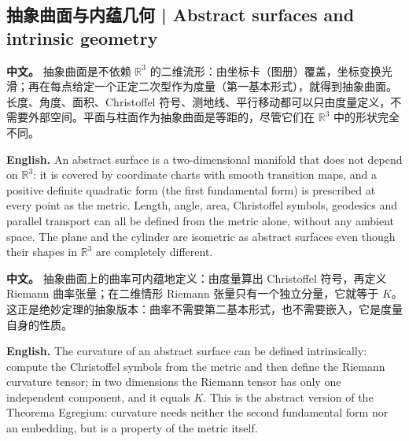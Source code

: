 \documentclass[UTF8,11pt,a4paper]{ctexart}
\newcommand{\APS}[2]{\par\noindent\textbf{中文。} #1\par\noindent\textbf{English.} #2\par\smallskip}
\newcommand{\RR}{\mathbb{R}}
\begin{document}
\subsection{抽象曲面与内蕴几何 | Abstract surfaces and intrinsic geometry}
\APS{抽象曲面是不依赖 $\RR^3$ 的二维流形：由坐标卡（图册）覆盖，坐标变换光滑；再在每点给定一个正定二次型作为度量（第一基本形式），就得到抽象曲面。长度、角度、面积、Christoffel 符号、测地线、平行移动都可以只由度量定义，不需要外部空间。平面与柱面作为抽象曲面是等距的，尽管它们在 $\RR^3$ 中的形状完全不同。}{An abstract surface is a two-dimensional manifold that does not depend on $\RR^3$: it is covered by coordinate charts with smooth transition maps, and a positive definite quadratic form (the first fundamental form) is prescribed at every point as the metric. Length, angle, area, Christoffel symbols, geodesics and parallel transport can all be defined from the metric alone, without any ambient space. The plane and the cylinder are isometric as abstract surfaces even though their shapes in $\RR^3$ are completely different.}
\APS{抽象曲面上的曲率可内蕴地定义：由度量算出 Christoffel 符号，再定义 Riemann 曲率张量；在二维情形 Riemann 张量只有一个独立分量，它就等于 $K$。这正是绝妙定理的抽象版本：曲率不需要第二基本形式，也不需要嵌入，它是度量自身的性质。}{The curvature of an abstract surface can be defined intrinsically: compute the Christoffel symbols from the metric and then define the Riemann curvature tensor; in two dimensions the Riemann tensor has only one independent component, and it equals $K$. This is the abstract version of the Theorema Egregium: curvature needs neither the second fundamental form nor an embedding, but is a property of the metric itself.}
\end{document}
